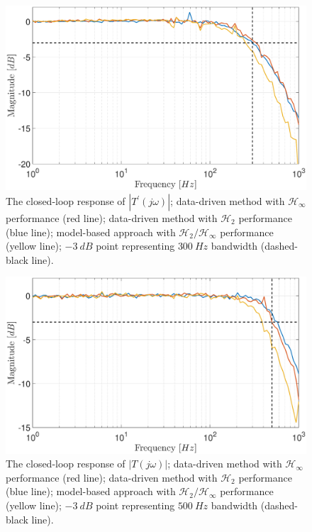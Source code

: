 \documentclass[a4paper, 10pt, conference]{ieeeconf}
\begin{document}
\begin{figure}
\centering
\includegraphics[width=\columnwidth]{../pics/d_loop_mag.eps}
\caption{The closed-loop response of $|T^{\prime}(j\omega)|$; data-driven method with $\mathcal{H}_{\infty}$ performance (red line); data-driven method with $\mathcal{H}_2$ performance (blue line); model-based approach with $\mathcal{H}_2 / \mathcal{H}_\infty$ performance (yellow line); $-3 \: dB$ point representing $300 \: Hz$ bandwidth (dashed-black line).}
\label{fig:d_loop}
\end{figure} 

\begin{figure}
\centering
\includegraphics[width=\columnwidth]{../pics/v_loop_mag.eps}
\caption{The closed-loop response of $|T(j\omega)|$; data-driven method with $\mathcal{H}_{\infty}$ performance (red line); data-driven method with $\mathcal{H}_2$ performance (blue line); model-based approach with $\mathcal{H}_2 / \mathcal{H}_\infty$ performance (yellow line); $-3 \: dB$ point representing $500 \: Hz$ bandwidth (dashed-black line).}
\label{fig:v_loop}
\end{figure} 
\end{document}

